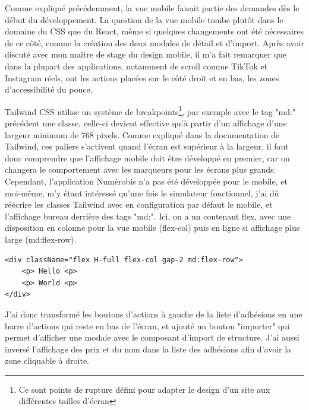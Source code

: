 \documentclass[a4paper,12pt]{report}
\begin{document}
Comme expliqué précédemment, la vue mobile faisait partie des demandes dès le début du développement. La question de la vue mobile tombe plutôt dans le domaine du CSS que du React, même si quelques changements ont été nécessaires de ce côté, comme la création des deux modales de détail et d'import. Après avoir discuté avec mon maître de stage du design mobile, il m'a fait remarquer que dans la plupart des applications, notamment de scroll comme TikTok et Instagram réels, ont les actions placées sur le côté droit et en bas, les zones d'accessibilité du pouce.

Tailwind CSS utilise un système de breakpoints\footnote{Ce sont points de rupture défini pour adapter le design d’un site aux différentes tailles d’écran}, par exemple avec le tag "md:" précédent une classe, celle-ci devient effective qu'à partir d'un affichage d'une largeur minimum de 768 pixels. Comme expliqué dans la documentation de Tailwind, ces paliers s'activent quand l'écran est supérieur à la largeur, il faut donc comprendre que l'affichage mobile doit être développé en premier, car on changera le comportement avec les marqueurs pour les écrans plus grands. Cependant, l'application Numérobis n'a pas été développée pour le mobile, et moi-même, m'y étant intéressé qu'une fois le simulateur fonctionnel, j'ai dû réécrire les classes Tailwind avec en configuration par défaut le mobile, et l'affichage bureau derrière des tags "md:". Ici, on a un contenant flex, avec une disposition en colonne pour la vue mobile (flex-col) puis en ligne si affichage plus large (md:flex-row).


\begin{verbatim}
<div className="flex H-full flex-col gap-2 md:flex-row">
    <p> Hello <p>
    <p> World <p>
</div>
\end{verbatim}


J'ai donc transformé les boutons d'actions à gauche de la liste d'adhésions en une barre d'actions qui reste en bas de l'écran, et ajouté un bouton "importer" qui permet d'afficher une modale avec le composant d'import de structure. J'ai aussi inversé l'affichage des prix et du nom dans la liste des adhésions afin d'avoir la zone cliquable à droite.
\end{document}
